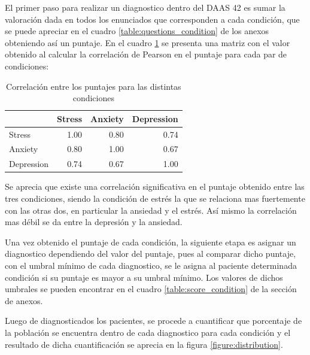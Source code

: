 El  primer paso para realizar un diagnostico dentro del DAAS 42 es sumar la valoración dada en todos los enunciados que corresponden a cada condición,  que se puede apreciar en el cuadro \ref{table:questions_condition} de los anexos obteniendo así un puntaje. En el cuadro \ref{table:correlation}  se presenta una matriz con el valor obtenido al calcular la correlación de Pearson en el puntaje para cada par de condiciones:

\begin{table}[ht]
\centering
\caption{Correlación entre los puntajes para las distintas condiciones}
\begin{tabular}{lrrr}
\toprule
{} &  Stress &  Anxiety &  Depression \\
\midrule
Stress     &    1.00 &     0.80 &        0.74 \\
Anxiety    &    0.80 &     1.00 &        0.67 \\
Depression &    0.74 &     0.67 &        1.00 \\
\bottomrule
\end{tabular}
\label{table:correlation}
\end{table}%

Se aprecia que existe una correlación significativa en el puntaje obtenido entre las tres condiciones, siendo la condición de estrés la que se relaciona mas fuertemente con las otras dos, en particular la ansiedad y el estrés. Así mismo la correlación mas débil se da entre la depresión y la ansiedad. 
 \medbreak

Una vez obtenido el puntaje de cada condición, la siguiente etapa es asignar un diagnostico dependiendo del valor del puntaje, pues al comparar dicho puntaje, con el umbral mínimo de cada diagnostico, se le asigna al paciente determinada condición si su puntaje es mayor a su umbral mínimo. Los valores de dichos umbrales se pueden encontrar en el cuadro \ref{table:score_condition} de la sección de anexos. 
 \medbreak

Luego de diagnosticados los pacientes, se procede a cuantificar que porcentaje de la población se encuentra dentro de cada diagnostico para cada condición y el resultado de dicha cuantificación se aprecia en la figura \ref{figure:distribution}.
 \medbreak
 

